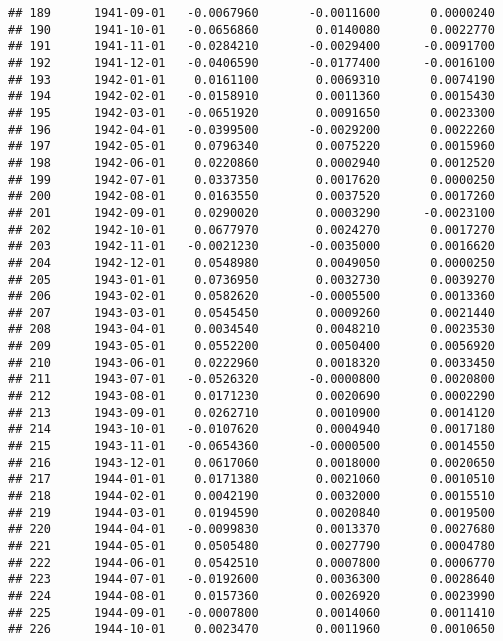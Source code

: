 \documentclass[
]{article}
\begin{document}
\begin{verbatim}
## 189      1941-09-01   -0.0067960       -0.0011600       0.0000240
## 190      1941-10-01   -0.0656860        0.0140080       0.0022770
## 191      1941-11-01   -0.0284210       -0.0029400      -0.0091700
## 192      1941-12-01   -0.0406590       -0.0177400      -0.0016100
## 193      1942-01-01    0.0161100        0.0069310       0.0074190
## 194      1942-02-01   -0.0158910        0.0011360       0.0015430
## 195      1942-03-01   -0.0651920        0.0091650       0.0023300
## 196      1942-04-01   -0.0399500       -0.0029200       0.0022260
## 197      1942-05-01    0.0796340        0.0075220       0.0015960
## 198      1942-06-01    0.0220860        0.0002940       0.0012520
## 199      1942-07-01    0.0337350        0.0017620       0.0000250
## 200      1942-08-01    0.0163550        0.0037520       0.0017260
## 201      1942-09-01    0.0290020        0.0003290      -0.0023100
## 202      1942-10-01    0.0677970        0.0024270       0.0017270
## 203      1942-11-01   -0.0021230       -0.0035000       0.0016620
## 204      1942-12-01    0.0548980        0.0049050       0.0000250
## 205      1943-01-01    0.0736950        0.0032730       0.0039270
## 206      1943-02-01    0.0582620       -0.0005500       0.0013360
## 207      1943-03-01    0.0545450        0.0009260       0.0021440
## 208      1943-04-01    0.0034540        0.0048210       0.0023530
## 209      1943-05-01    0.0552200        0.0050400       0.0056920
## 210      1943-06-01    0.0222960        0.0018320       0.0033450
## 211      1943-07-01   -0.0526320       -0.0000800       0.0020800
## 212      1943-08-01    0.0171230        0.0020690       0.0002290
## 213      1943-09-01    0.0262710        0.0010900       0.0014120
## 214      1943-10-01   -0.0107620        0.0004940       0.0017180
## 215      1943-11-01   -0.0654360       -0.0000500       0.0014550
## 216      1943-12-01    0.0617060        0.0018000       0.0020650
## 217      1944-01-01    0.0171380        0.0021060       0.0010510
## 218      1944-02-01    0.0042190        0.0032000       0.0015510
## 219      1944-03-01    0.0194590        0.0020840       0.0019500
## 220      1944-04-01   -0.0099830        0.0013370       0.0027680
## 221      1944-05-01    0.0505480        0.0027790       0.0004780
## 222      1944-06-01    0.0542510        0.0007800       0.0006770
## 223      1944-07-01   -0.0192600        0.0036300       0.0028640
## 224      1944-08-01    0.0157360        0.0026920       0.0023990
## 225      1944-09-01   -0.0007800        0.0014060       0.0011410
## 226      1944-10-01    0.0023470        0.0011960       0.0010650

\end{verbatim}
\end{document}
